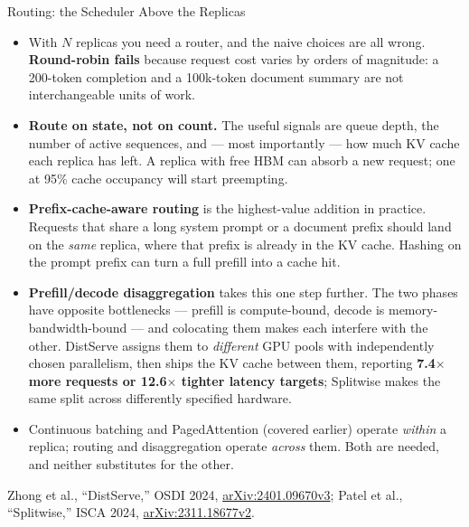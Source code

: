 \begin{frame}[allowframebreaks]{Routing: the Scheduler Above the Replicas}
  \begin{itemize}\itemsep0.4em
    \item[\textcolor{red}{$\blacktriangleright$}] With $N$ replicas you need a router, and the naive choices are all wrong. \textbf{Round-robin fails} because request cost varies by orders of magnitude: a 200-token completion and a 100k-token document summary are not interchangeable units of work.
    \item[\textcolor{red}{$\blacktriangleright$}] \textbf{Route on state, not on count.} The useful signals are queue depth, the number of active sequences, and --- most importantly --- how much KV cache each replica has left. A replica with free HBM can absorb a new request; one at 95\% cache occupancy will start preempting.
    \item[\textcolor{red}{$\blacktriangleright$}] \textbf{Prefix-cache-aware routing} is the highest-value addition in practice. Requests that share a long system prompt or a document prefix should land on the \emph{same} replica, where that prefix is already in the KV cache. Hashing on the prompt prefix can turn a full prefill into a cache hit.
    \item[\textcolor{red}{$\blacktriangleright$}] \textbf{Prefill/decode disaggregation} takes this one step further. The two phases have opposite bottlenecks --- prefill is compute-bound, decode is memory-bandwidth-bound --- and colocating them makes each interfere with the other. DistServe assigns them to \emph{different} GPU pools with independently chosen parallelism, then ships the KV cache between them, reporting \textbf{7.4$\times$ more requests or 12.6$\times$ tighter latency targets}; Splitwise makes the same split across differently specified hardware.
    \item[\textcolor{red}{$\blacktriangleright$}] Continuous batching and PagedAttention (covered earlier) operate \emph{within} a replica; routing and disaggregation operate \emph{across} them. Both are needed, and neither substitutes for the other.
  \end{itemize}
  \vspace{0.1em}
  {\scriptsize Zhong et al., ``DistServe,'' OSDI 2024, \href{https://arxiv.org/abs/2401.09670v3}{arXiv:2401.09670v3}; Patel et al., ``Splitwise,'' ISCA 2024, \href{https://arxiv.org/abs/2311.18677v2}{arXiv:2311.18677v2}.}
\end{frame}

